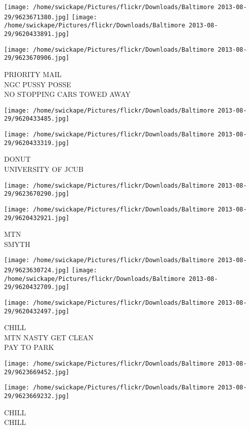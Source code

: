 \documentclass[10pt,letterpaper]{article}
\begin{document}
\texttt{[image: /home/swickape/Pictures/flickr/Downloads/Baltimore 2013-08-29/9623671380.jpg]}
\texttt{[image: /home/swickape/Pictures/flickr/Downloads/Baltimore 2013-08-29/9620433891.jpg]}

\texttt{[image: /home/swickape/Pictures/flickr/Downloads/Baltimore 2013-08-29/9623670906.jpg]}

PRIORITY MAIL\\
NGC PUSSY POSSE\\
NO STOPPING CARS TOWED AWAY
\pagebreak

\texttt{[image: /home/swickape/Pictures/flickr/Downloads/Baltimore 2013-08-29/9620433485.jpg]}

\vspace{0.25in}
\texttt{[image: /home/swickape/Pictures/flickr/Downloads/Baltimore 2013-08-29/9620433319.jpg]}

DONUT\\
UNIVERSITY OF JCUB
\pagebreak

\texttt{[image: /home/swickape/Pictures/flickr/Downloads/Baltimore 2013-08-29/9623670290.jpg]}

\vspace{0.25in}
\texttt{[image: /home/swickape/Pictures/flickr/Downloads/Baltimore 2013-08-29/9620432921.jpg]}

MTN\\
SMYTH
\pagebreak

\texttt{[image: /home/swickape/Pictures/flickr/Downloads/Baltimore 2013-08-29/9623630724.jpg]}
\texttt{[image: /home/swickape/Pictures/flickr/Downloads/Baltimore 2013-08-29/9620432709.jpg]}

\texttt{[image: /home/swickape/Pictures/flickr/Downloads/Baltimore 2013-08-29/9620432497.jpg]}

CHILL\\
MTN NASTY GET CLEAN\\
PAY TO PARK
\pagebreak

\texttt{[image: /home/swickape/Pictures/flickr/Downloads/Baltimore 2013-08-29/9623669452.jpg]}

\vspace{0.25in}
\texttt{[image: /home/swickape/Pictures/flickr/Downloads/Baltimore 2013-08-29/9623669232.jpg]}

CHILL\\
CHILL
\pagebreak
\end{document}
